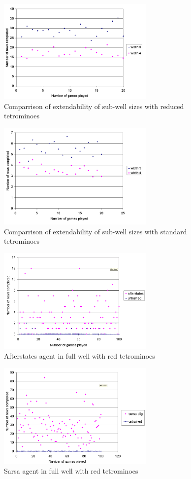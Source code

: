 \documentclass{rucsthesis}
\begin{document}
\begin{figure}[h]
\centering
\includegraphics[width=3in]{widthcomparrison.png}
\caption{Comparrison of extendability of sub-well sizes with reduced tetrominoes}
\label{fig:comparemelax}
\end{figure}

\begin{figure}[h]
\centering
\includegraphics[width=3in]{widthcomparrisonfulltet.png}
\caption{Comparrison of extendability of sub-well sizes with standard tetrominoes}
\label{fig:comparemelax}
\end{figure}


\begin{figure}[h]
\centering
\includegraphics[width=3in]{Afterstatesredtetfullwell.png}
\caption{Afterstates agent in full well with red tetrominoes}
\label{fig:comparemelax}
\end{figure}

\begin{figure}[h]
\centering
\includegraphics[width=3in]{sarsaeligredtetfullwell.png}
\caption{Sarsa agent in full well with red tetrominoes}
\label{fig:comparemelax}
\end{figure}
\end{document}

